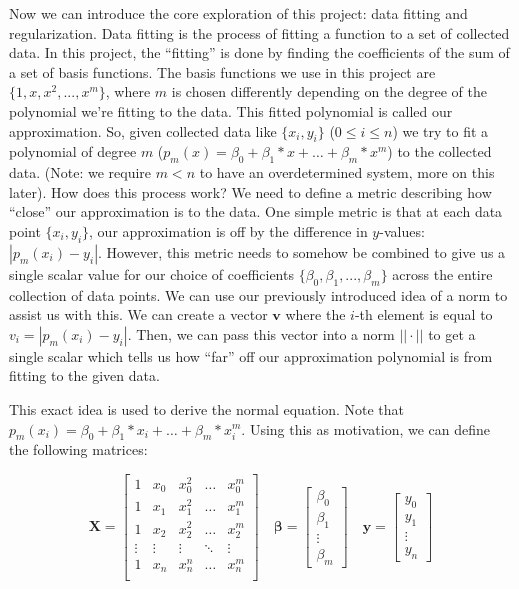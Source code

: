 \documentclass{article}
\newcommand{\V}{\mathbf{v}} %
\newcommand{\y}{\mathbf{y}}
\newcommand{\X}{\mathbf{X}}
\newcommand{\B}{\boldsymbol\beta} %
\begin{document}
Now we can introduce the core exploration of this project: data fitting and regularization. Data fitting is the process of fitting a function to a set of collected data. In this project, the ``fitting'' is done by finding the coefficients of the sum of a set of basis functions. The basis functions we use in this project are $\{1,x,x^2,...,x^m\}$, where $m$ is chosen differently depending on the degree of the polynomial we're fitting to the data. This fitted polynomial is called our approximation. So, given collected data like $\{x_i,y_i\}$ ($0 \le i \le n$) we try to fit a polynomial of degree $m$ ($p_m(x)=\beta_0+\beta_1*x+\ldots+\beta_m*x^m$) to the collected data. (Note: we require $m<n$ to have an overdetermined system, more on this later). How does this process work? We need to define a metric describing how ``close'' our approximation is to the data. One simple metric is that at each data point $\{x_i,y_i\}$, our approximation is off by the difference in $y$-values: $|p_m(x_i)-y_i|$. However, this metric needs to somehow be combined to give us a single scalar value for our choice of coefficients $\{\beta_0,\beta_1,...,\beta_m\}$ across the entire collection of data points. We can use our previously introduced idea of a norm to assist us with this. We can create a vector $\V$ where the $i$-th element is equal to $v_i=|p_m(x_i)-y_i|$. Then, we can pass this vector into a norm $||\cdot||$ to get a single scalar which tells us how ``far'' off our approximation polynomial is from fitting to the given data.

This exact idea is used to derive the normal equation. Note that $p_m(x_i)=\beta_0+\beta_1*x_i+\ldots+\beta_m*x_i^m$. Using this as motivation, we can define the following matrices:

\begin{equation*}
    \X =
    \begin{bmatrix}
        1 & x_0 & x_0 ^2 & \ldots & x_0^m \\
        1 & x_1 & x_1 ^2 & \ldots & x_1^m \\
        1 & x_2 & x_2 ^2 & \ldots & x_2^m \\
        \vdots & \vdots & \vdots & \ddots & \vdots \\
        1 & x_n & x_n ^n & \ldots & x_n^m \\
    \end{bmatrix}
    \quad
    \B =
    \begin{bmatrix}
        \beta_0\\
        \beta_1\\
        \vdots\\
        \beta_m
    \end{bmatrix}
    \quad
    \y =
    \begin{bmatrix}
        y_0\\
        y_1\\
        \vdots\\
        y_n
    \end{bmatrix}
\end{equation*}
\end{document}

